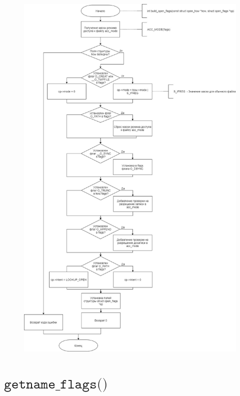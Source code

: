 \documentclass[a4paper,14pt]{extreport}
\begin{document}
\begin{figure}[H]
	\centering
	\includegraphics[scale=0.4]{img/build_open_flags.jpg}
\end{figure}




















\section{$\texttt{getname\_flags()}$}
\end{document}
